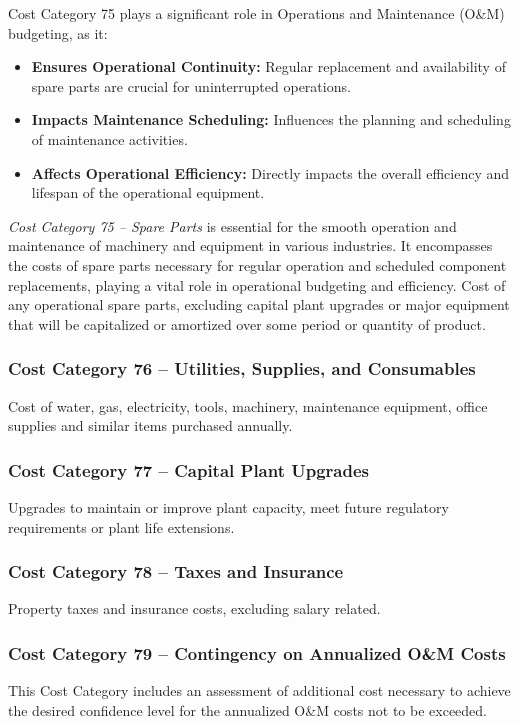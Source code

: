 Cost Category 75 plays a significant role in Operations and Maintenance (O\&M) budgeting, as it:

\begin{itemize}
    \item \textbf{Ensures Operational Continuity:} Regular replacement and availability of spare parts are crucial for uninterrupted operations.
    \item \textbf{Impacts Maintenance Scheduling:} Influences the planning and scheduling of maintenance activities.
    \item \textbf{Affects Operational Efficiency:} Directly impacts the overall efficiency and lifespan of the operational equipment.
\end{itemize}

\textit{Cost Category 75 – Spare Parts} is essential for the smooth operation and maintenance of machinery and equipment in various industries. It encompasses the costs of spare parts necessary for regular operation and scheduled component replacements, playing a vital role in operational budgeting and efficiency.  Cost of any operational spare parts, excluding capital plant upgrades or major equipment that will be capitalized or amortized over some period or quantity of product.

\subsubsection*{Cost Category 76 – Utilities, Supplies, and Consumables}
Cost of water, gas, electricity, tools, machinery, maintenance equipment, office supplies and similar items purchased annually.

\subsubsection*{Cost Category 77 – Capital Plant Upgrades}
Upgrades to maintain or improve plant capacity, meet future regulatory requirements or plant life extensions.

\subsubsection*{Cost Category 78 – Taxes and Insurance}
Property taxes and insurance costs, excluding salary related.

\subsubsection*{Cost Category 79 – Contingency on Annualized O\&M Costs}
This Cost Category includes an assessment of additional cost necessary to achieve the desired confidence level for the annualized O\&M costs not to be exceeded.
